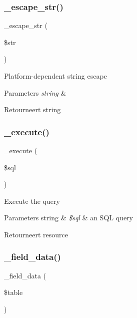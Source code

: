 \subsubsection{\texorpdfstring{\_escape\_str()}{\_escape\_str()}}
{\footnotesize\ttfamily \+\_\+escape\+\_\+str (\begin{DoxyParamCaption}\item[{}]{\$str }\end{DoxyParamCaption})\hspace{0.3cm}{\ttfamily [protected]}}

Platform-\/dependent string escape


\begin{DoxyParams}{Parameters}
{\em string} & \\
\hline
\end{DoxyParams}
\begin{DoxyReturn}{Retourneert}
string 
\end{DoxyReturn}
\mbox{\label{class_c_i___d_b__odbc__driver_a114ab675d89bf8324a41785fb475e86d}} 
\subsubsection{\texorpdfstring{\_execute()}{\_execute()}}
{\footnotesize\ttfamily \+\_\+execute (\begin{DoxyParamCaption}\item[{}]{\$sql }\end{DoxyParamCaption})\hspace{0.3cm}{\ttfamily [protected]}}

Execute the query


\begin{DoxyParams}[1]{Parameters}
string & {\em \$sql} & an S\+QL query \\
\hline
\end{DoxyParams}
\begin{DoxyReturn}{Retourneert}
resource 
\end{DoxyReturn}
\mbox{\label{class_c_i___d_b__odbc__driver_a95247d9671893adc3444cb184ad32ea1}} 
\subsubsection{\texorpdfstring{\_field\_data()}{\_field\_data()}}
{\footnotesize\ttfamily \+\_\+field\+\_\+data (\begin{DoxyParamCaption}\item[{}]{\$table }\end{DoxyParamCaption})\hspace{0.3cm}{\ttfamily [protected]}}

